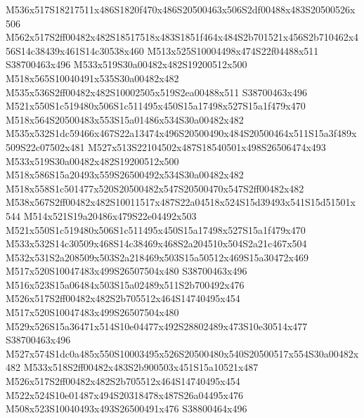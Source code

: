 \documentclass{article}
\begin{document}
\begin{multicols}{2}





M536x517S18217511x486S1820f470x486S20500463x506S2df00488x483S20500526x506 M562x517S2ff00482x482S18517518x483S1851f464x484S2b701521x456S2b710462x456S14c38439x461S14c30538x460 M513x525S10004498x474S22f04488x511 S38700463x496 M533x519S30a00482x482S19200512x500 M518x565S10040491x535S30a00482x482 M535x536S2ff00482x482S10002505x519S2ea00488x511 S38700463x496 M521x550S1c519480x506S1c511495x450S15a17498x527S15a1f479x470 M518x564S20500483x553S15a01486x534S30a00482x482 M535x532S1dc59466x467S22a13474x496S20500490x484S20500464x511S15a3f489x509S22c07502x481 M527x513S22104502x487S18540501x498S26506474x493 M533x519S30a00482x482S19200512x500 M518x586S15a20493x559S26500492x534S30a00482x482 M518x558S1c501477x520S20500482x547S20500470x547S2ff00482x482 M538x567S2ff00482x482S10011517x487S22a04518x524S15d39493x541S15d51501x544 M514x521S19a20486x479S22e04492x503 M521x550S1c519480x506S1c511495x450S15a17498x527S15a1f479x470 M533x532S14c30509x468S14c38469x468S2a204510x504S2a21c467x504 M532x531S2a208509x503S2a218469x503S15a50512x469S15a30472x469 M517x520S10047483x499S26507504x480 S38700463x496 M516x523S15a06484x503S15a02489x511S2b700492x476 M526x517S2ff00482x482S2b705512x464S14740495x454 M517x520S10047483x499S26507504x480 M529x526S15a36471x514S10e04477x492S28802489x473S10e30514x477 S38700463x496 M527x574S1dc0a485x550S10003495x526S20500480x540S20500517x554S30a00482x482 M533x518S2ff00482x483S2b900503x451S15a10521x487 M526x517S2ff00482x482S2b705512x464S14740495x454 M522x524S10e01487x494S20318478x487S26a04495x476 M508x523S10040493x493S26500491x476 S38800464x496



\end{multicols}
\end{document}
